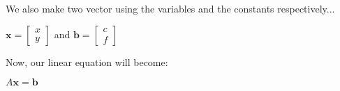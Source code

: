 \documentclass[a4paper]{article}
\begin{document}
We also make two vector using the variables and the constants respectively...
\begin{center}
    $\textbf{x} = \begin{bmatrix}
        x \\
        y 
    \end{bmatrix}$ \hspace{5px} 
    and \hspace{5px}
$\textbf{b} = \begin{bmatrix}
        c \\
        f 
    \end{bmatrix}$ 
\end{center}

Now, our linear equation will become:
\begin{center}
    $A\textbf{x} = \textbf{b}$
\end{center}
\end{document}
